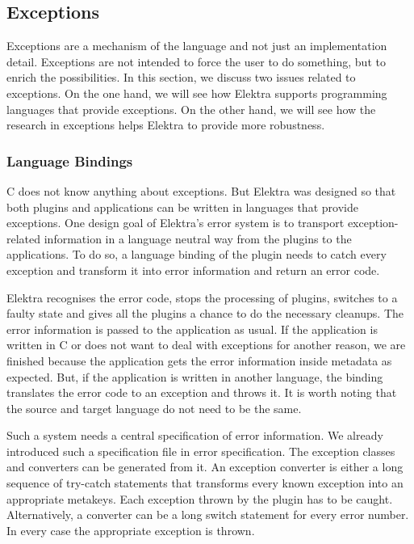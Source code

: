 \subsection*{Exceptions}

Exceptions are a mechanism of the language and not just an implementation detail. Exceptions are not intended to force the user to do something, but to enrich the possibilities. In this section, we discuss two issues related to exceptions. On the one hand, we will see how Elektra supports programming languages that provide exceptions. On the other hand, we will see how the research in exceptions helps Elektra to provide more robustness.

\subsubsection*{Language Bindings}

C does not know anything about exceptions. But Elektra was designed so that both plugins and applications can be written in languages that provide exceptions. One design goal of Elektra’s error system is to transport exception-\/related information in a language neutral way from the plugins to the applications. To do so, a language binding of the plugin needs to catch every exception and transform it into error information and return an error code.

Elektra recognises the error code, stops the processing of plugins, switches to a faulty state and gives all the plugins a chance to do the necessary cleanups. The error information is passed to the application as usual. If the application is written in C or does not want to deal with exceptions for another reason, we are finished because the application gets the error information inside metadata as expected. But, if the application is written in another language, the binding translates the error code to an exception and throws it. It is worth noting that the source and target language do not need to be the same.

Such a system needs a central specification of error information. We already introduced such a specification file in error specification. The exception classes and converters can be generated from it. An exception converter is either a long sequence of try-\/catch statements that transforms every known exception into an appropriate metakeys. Each exception thrown by the plugin has to be caught. Alternatively, a converter can be a long switch statement for every error number. In every case the appropriate exception is thrown.

